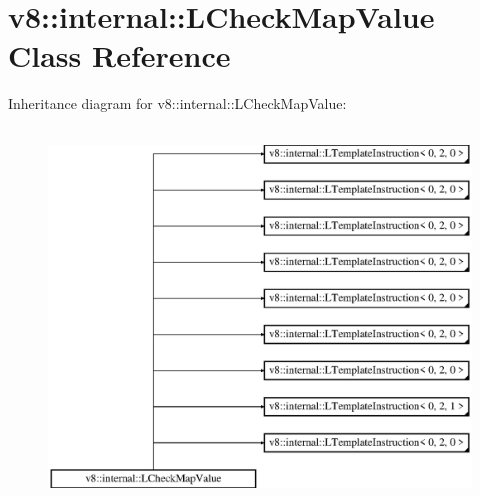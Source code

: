 \hypertarget{classv8_1_1internal_1_1_l_check_map_value}{}\section{v8\+:\+:internal\+:\+:L\+Check\+Map\+Value Class Reference}
\label{classv8_1_1internal_1_1_l_check_map_value}
Inheritance diagram for v8\+:\+:internal\+:\+:L\+Check\+Map\+Value\+:\begin{figure}[H]
\begin{center}
\leavevmode
\includegraphics[height=10.000000cm]{classv8_1_1internal_1_1_l_check_map_value}
\end{center}
\end{figure}
